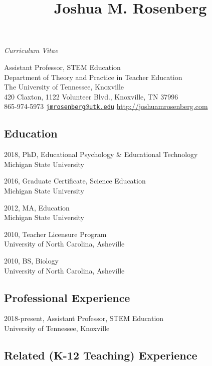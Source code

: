 \documentclass[14,]{article}
\title{Joshua M. Rosenberg}
\author{}
\date{}
\begin{document}
\maketitle

\begin{center}
\textit{Curriculum Vitae}
\end{center}

\begingroup
\center
Assistant Professor, STEM Education\\
Department of Theory and Practice in Teacher Education\\
The University of Tennessee, Knoxville\\
420 Claxton, 1122 Volunteer Blvd., Knoxville, TN 37996\\
865-974-5973 \textbar{}
\href{mailto:jmrosenberg@utk.edu}{\nolinkurl{jmrosenberg@utk.edu}}
\textbar{} \url{http://joshuamrosenberg.com}\\
\endgroup

\subsection{Education}\label{education}

2018, PhD, Educational Psychology \& Educational Technology\\
Michigan State University

2016, Graduate Certificate, Science Education\\
Michigan State University

2012, MA, Education\\
Michigan State University

2010, Teacher Licensure Program\\
University of North Carolina, Asheville

2010, BS, Biology\\
University of North Carolina, Asheville

\subsection{Professional Experience}\label{professional-experience}

2018-present, Assistant Professor, STEM Education\\
University of Tennessee, Knoxville

\subsection{Related (K-12 Teaching)
Experience}\label{related-k-12-teaching-experience}
\end{document}
